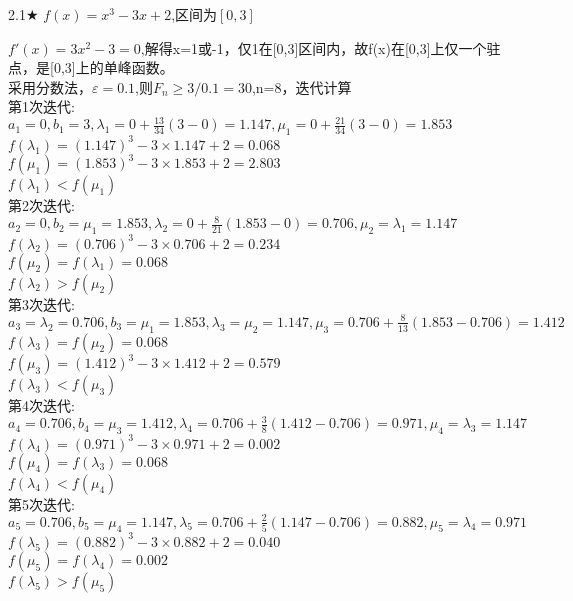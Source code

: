 \begin{problem}{2.1$\bigstar$}
    $f(x)=x^3-3x+2$,区间为$[0,3]$
\end{problem}
\begin{solution}
    $f'(x)=3x^2-3=0$,解得x=1或-1，仅1在[0,3]区间内，故f(x)在[0,3]上仅一个驻点，是[0,3]上的单峰函数。\\
    采用分数法，$\varepsilon=0.1$,则$F_n\geq3/0.1=30$,n=8，迭代计算\\
    第1次迭代:\\
    $a_1=0,b_1=3,\lambda_1=0+\frac{13}{34}(3-0)=1.147,\mu_1=0+\frac{21}{34}(3-0)=1.853$\\
    $f(\lambda_1)=(1.147)^3-3\times1.147+2=0.068$\\
    $f(\mu_1)=(1.853)^3-3\times1.853+2=2.803$\\
    $f(\lambda_1)<f(\mu_1)$\\
    第2次迭代:\\
    $a_2=0,b_2=\mu_1=1.853,\lambda_2=0+\frac{8}{21}(1.853-0)=0.706,\mu_2=\lambda_1=1.147$\\
    $f(\lambda_2)=(0.706)^3-3\times0.706+2=0.234$\\
    $f(\mu_2)=f(\lambda_1)=0.068$\\
    $f(\lambda_2)>f(\mu_2)$\\
    第3次迭代:\\
    $a_3=\lambda_2=0.706,b_3=\mu_1=1.853,\lambda_3=\mu_2=1.147,\mu_3=0.706+\frac{8}{13}(1.853-0.706)=1.412$\\
    $f(\lambda_3)=f(\mu_2)=0.068$\\
    $f(\mu_3)=(1.412)^3-3\times1.412+2=0.579$\\
    $f(\lambda_3)<f(\mu_3)$\\
    第4次迭代:\\
    $a_4=0.706,b_4=\mu_3=1.412,\lambda_4=0.706+\frac{3}{8}(1.412-0.706)=0.971,\mu_4=\lambda_3=1.147$\\
    $f(\lambda_4)=(0.971)^3-3\times0.971+2=0.002$\\
    $f(\mu_4)=f(\lambda_3)=0.068$\\
    $f(\lambda_4)<f(\mu_4)$\\
    第5次迭代:\\
    $a_5=0.706,b_5=\mu_4=1.147,\lambda_5=0.706+\frac{2}{5}(1.147-0.706)=0.882,\mu_5=\lambda_4=0.971$\\
    $f(\lambda_5)=(0.882)^3-3\times0.882+2=0.040$\\
    $f(\mu_5)=f(\lambda_4)=0.002$\\
    $f(\lambda_5)>f(\mu_5)$\\

\end{solution}
